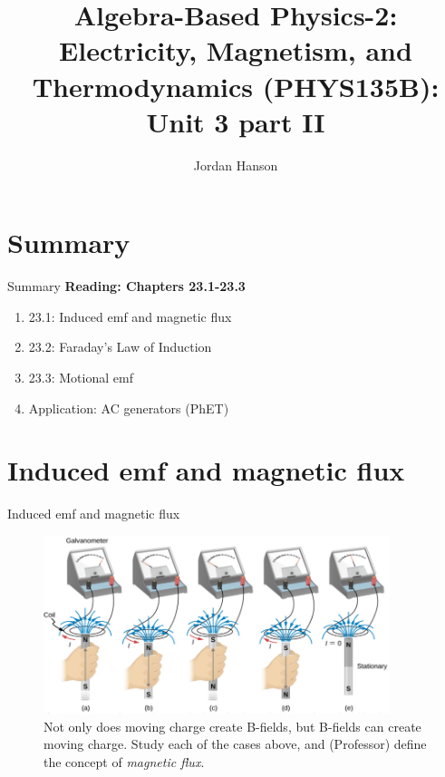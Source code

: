 \documentclass{beamer}
\title{Algebra-Based Physics-2: Electricity, Magnetism, and Thermodynamics (PHYS135B): Unit 3 part II}
\author{Jordan Hanson}
\institute{Whittier College Department of Physics and Astronomy}
\begin{document}
\maketitle

\section{Summary}

\begin{frame}{Summary}
\textbf{Reading: Chapters 23.1-23.3} \\ \vspace{0.5cm}
\begin{enumerate}
\item 23.1: Induced emf and magnetic flux
\item 23.2: Faraday's Law of Induction
\item 23.3: Motional emf
\item Application: AC generators (PhET)
\end{enumerate}
\end{frame}

\section{Induced emf and magnetic flux}

\begin{frame}{Induced emf and magnetic flux}
\begin{figure}
\centering
\includegraphics[width=0.9\textwidth]{figures/farad.png}
\caption{\label{fig:farad1} Not only does moving charge create B-fields, but B-fields can create moving charge.  Study each of the cases above, and (Professor) define the concept of \textit{magnetic flux}.}
\end{figure}
\end{frame}
\end{document}
